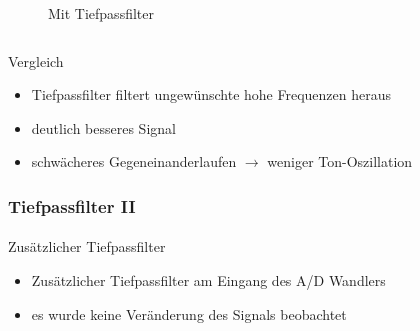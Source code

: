 \begin{frame}
\begin{columns}[c]
\begin{figure}[H]
\begin{center}
            \end{center}
            \caption{Mit Tiefpassfilter}
            \end{figure}  
    \end{columns}
    \begin{block}{Vergleich}
        \begin{itemize}
            \item Tiefpassfilter filtert ungewünschte hohe Frequenzen heraus
            \item deutlich besseres Signal
            \item schwächeres Gegeneinanderlaufen $\rightarrow$ weniger Ton-Oszillation
        \end{itemize}
    \end{block}
\end{frame}
\begin{frame}
    \frametitle{Tiefpassfilter II}
    \framesubtitle{}
    \begin{block}{Zusätzlicher Tiefpassfilter}
         \begin{itemize}
             \item Zusätzlicher Tiefpassfilter am Eingang des A/D Wandlers 
             \item es wurde keine Veränderung des Signals beobachtet
         \end{itemize}
    \end{block}
\end{frame}

